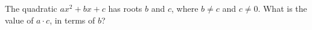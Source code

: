 The quadratic $ax^2+bx+c$ has roots $b$ and $c$, where $b\ne c$ and $c\ne0$. What is the value of $a\cdot c$, in terms of $b$?
